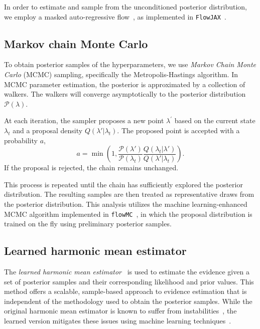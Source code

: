 \documentclass[prd,twocolumn,a4paper,floatfix,nofootinbib,preprintnumbers,superscriptaddress]{revtex4-1}
\begin{document}
In order to estimate and sample from the unconditioned posterior distribution, we employ a masked auto-regressive flow~\cite{Kingma:2016wtg, Papamakarios:2017tec}, as implemented in \texttt{FlowJAX}~\cite{ward2023flowjax}.

\subsection{Markov chain Monte Carlo}
To obtain posterior samples of the hyperparameters, we use \textit{Markov Chain Monte Carlo} (MCMC) sampling, specifically the Metropolis-Hastings algorithm. In MCMC parameter estimation, the posterior is approximated by a collection of walkers. The walkers will converge asymptotically to the posterior distribution $\mathcal{P}(\lambda)$. 

At each iteration, the sampler proposes a new point $\lambda^\prime$ based on the current state $\lambda_t$ and a proposal density $Q(\lambda' | \lambda_t)$. The proposed point is accepted with a probability $a$,
\begin{equation}
    a = \min\left(1, \frac{\mathcal{P}(\lambda')}{\mathcal{P}(\lambda_t)}\frac{Q(\lambda_t | \lambda')}{Q(\lambda' | \lambda_t)}\right).
\end{equation}
If the proposal is rejected, the chain remains unchanged.

This process is repeated until the chain has sufficiently explored the posterior distribution. The resulting samples are then treated as representative draws from the posterior distribution. This analysis utilizes the machine learning-enhanced MCMC algorithm implemented in \texttt{flowMC}~\cite{Wong:2022xvh, Gabrie:2021tlu}, in which the proposal distribution is trained on the fly using preliminary posterior samples.

\subsection{Learned harmonic mean estimator}

The \textit{learned harmonic mean estimator}~\cite{Polanska:2024arc, Piras:2024dml, SpurioMancini:2022vcy} is used to estimate the evidence given a set of posterior samples and their corresponding likelihood and prior values. This method offers a scalable, sample-based approach to evidence estimation that is independent of the methodology used to obtain the posterior samples. While the original harmonic mean estimator is known to suffer from instabilities~\cite{Newton:1994wlb}, the learned version mitigates these issues using machine learning techniques~\cite{Polanska:2024arc}.
\end{document}
